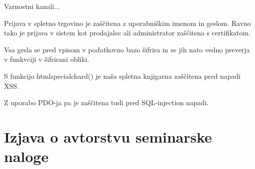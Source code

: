 \documentclass[a4paper,12pt]{report}
\begin{document}
Varnostni kanali... \newline

Prijava v spletno trgovino je zaščitena z uporabniškim imenom in geslom. Ravno tako je prijava v sistem kot prodajalec ali administrator zaščitena s certifikatom. \newline

Vsa gesla se pred vpisom v podatkovno bazo šifrira in se jih nato vedno preverja v funkvciji v šifrirani obliki.  \newline

S funkcijo htmlspecialchard() je naša spletna knjigarna zaščitena pred napadi XSS. \newline

Z uporabo PDO-ja pa je zaščitena tudi pred SQL-injection napadi. \newline


\chapter{Izjava o avtorstvu seminarske naloge}
\end{document}
